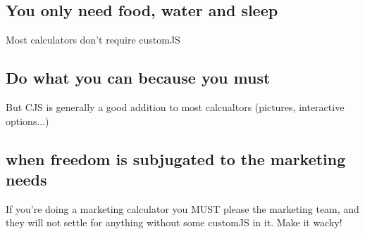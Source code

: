 \subsection{You only need food, water and sleep}
Most calculators don't require customJS
\subsection{Do what you can because you must}
But CJS is generally a good addition to most calcualtors (pictures, interactive options...)
\subsection{when freedom is subjugated to the marketing needs}
If you're doing a marketing calculator you MUST please the marketing team, and 
they will not settle for anything without some customJS in it. Make it wacky!



    